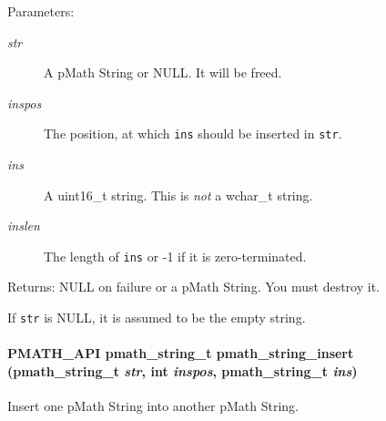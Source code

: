 \begin{Desc}
\item[Parameters:]
\begin{description}
\item[{\em str}]A pMath String or NULL. It will be freed. \item[{\em inspos}]The position, at which {\tt ins} should be inserted in {\tt str}. \item[{\em ins}]A uint16\_\-t string. This is {\em not\/} a wchar\_\-t string. \item[{\em inslen}]The length of {\tt ins} or -1 if it is zero-terminated. \end{description}
\end{Desc}
\begin{Desc}
\item[Returns:]NULL on failure or a pMath String. You must destroy it.\end{Desc}
If {\tt str} is NULL, it is assumed to be the empty string. \hypertarget{group__strings_g563af717f21793d72933a9914b23a6aa}{
\paragraph[{pmath\_\-string\_\-insert}]{\setlength{\rightskip}{0pt plus 5cm}PMATH\_\-API {\bf pmath\_\-string\_\-t} pmath\_\-string\_\-insert ({\bf pmath\_\-string\_\-t} {\em str}, \/  int {\em inspos}, \/  {\bf pmath\_\-string\_\-t} {\em ins})}\hfill}
\label{group__strings_g563af717f21793d72933a9914b23a6aa}


Insert one pMath String into another pMath String. 

